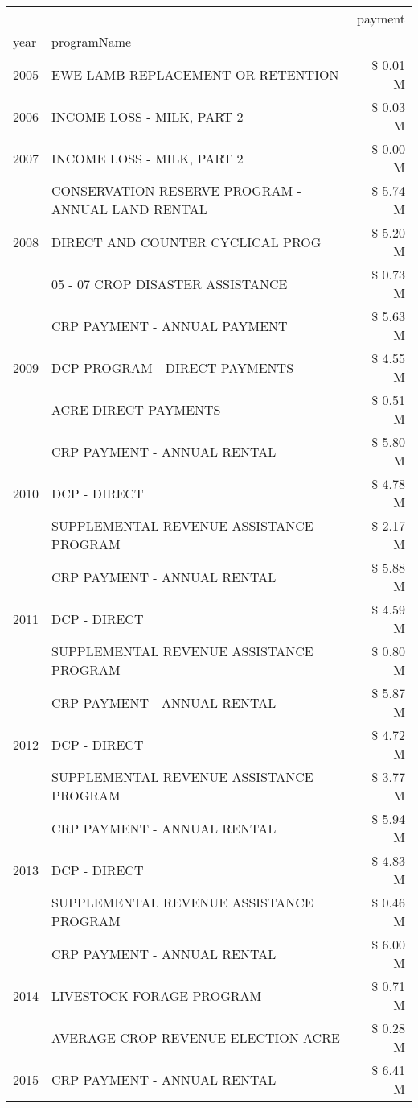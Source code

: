 \begin{tabular}{llr}
\toprule
 &  & payment \\
year & programName &  \\
\midrule
2005 & EWE LAMB REPLACEMENT OR RETENTION & \$ 0.01 M \\
\cline{1-3}
2006 & INCOME LOSS - MILK, PART 2 & \$ 0.03 M \\
\cline{1-3}
2007 & INCOME LOSS - MILK, PART 2 & \$ 0.00 M \\
\cline{1-3}
\multirow[t]{3}{*}{2008} & CONSERVATION RESERVE PROGRAM - ANNUAL LAND RENTAL & \$ 5.74 M \\
 & DIRECT AND COUNTER CYCLICAL PROG & \$ 5.20 M \\
 & 05 - 07 CROP DISASTER ASSISTANCE & \$ 0.73 M \\
\cline{1-3}
\multirow[t]{3}{*}{2009} & CRP PAYMENT - ANNUAL PAYMENT & \$ 5.63 M \\
 & DCP PROGRAM - DIRECT PAYMENTS & \$ 4.55 M \\
 & ACRE DIRECT PAYMENTS & \$ 0.51 M \\
\cline{1-3}
\multirow[t]{3}{*}{2010} & CRP PAYMENT - ANNUAL RENTAL & \$ 5.80 M \\
 & DCP - DIRECT & \$ 4.78 M \\
 & SUPPLEMENTAL REVENUE ASSISTANCE PROGRAM & \$ 2.17 M \\
\cline{1-3}
\multirow[t]{3}{*}{2011} & CRP PAYMENT - ANNUAL RENTAL & \$ 5.88 M \\
 & DCP - DIRECT & \$ 4.59 M \\
 & SUPPLEMENTAL REVENUE ASSISTANCE PROGRAM & \$ 0.80 M \\
\cline{1-3}
\multirow[t]{3}{*}{2012} & CRP PAYMENT - ANNUAL RENTAL & \$ 5.87 M \\
 & DCP - DIRECT & \$ 4.72 M \\
 & SUPPLEMENTAL REVENUE ASSISTANCE PROGRAM & \$ 3.77 M \\
\cline{1-3}
\multirow[t]{3}{*}{2013} & CRP PAYMENT - ANNUAL RENTAL & \$ 5.94 M \\
 & DCP - DIRECT & \$ 4.83 M \\
 & SUPPLEMENTAL REVENUE ASSISTANCE PROGRAM & \$ 0.46 M \\
\cline{1-3}
\multirow[t]{3}{*}{2014} & CRP PAYMENT - ANNUAL RENTAL & \$ 6.00 M \\
 & LIVESTOCK FORAGE PROGRAM & \$ 0.71 M \\
 & AVERAGE CROP REVENUE ELECTION-ACRE & \$ 0.28 M \\
\cline{1-3}
\multirow[t]{3}{*}{2015} & CRP PAYMENT - ANNUAL RENTAL & \$ 6.41 M \\

\end{tabular}
